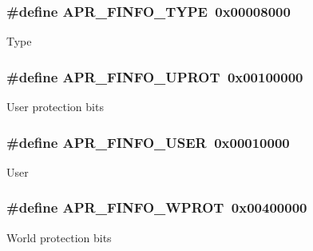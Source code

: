 \subsubsection[{\texorpdfstring{A\+P\+R\+\_\+\+F\+I\+N\+F\+O\+\_\+\+T\+Y\+PE}{APR_FINFO_TYPE}}]{\setlength{\rightskip}{0pt plus 5cm}\#define A\+P\+R\+\_\+\+F\+I\+N\+F\+O\+\_\+\+T\+Y\+PE~0x00008000}\hypertarget{group__apr__file__stat_gad5d25f25527ee77c08bb20aae141306c}{}\label{group__apr__file__stat_gad5d25f25527ee77c08bb20aae141306c}
Type 
\subsubsection[{\texorpdfstring{A\+P\+R\+\_\+\+F\+I\+N\+F\+O\+\_\+\+U\+P\+R\+OT}{APR_FINFO_UPROT}}]{\setlength{\rightskip}{0pt plus 5cm}\#define A\+P\+R\+\_\+\+F\+I\+N\+F\+O\+\_\+\+U\+P\+R\+OT~0x00100000}\hypertarget{group__apr__file__stat_gac85e4335fcf91881b11b3e8a4b224aca}{}\label{group__apr__file__stat_gac85e4335fcf91881b11b3e8a4b224aca}
User protection bits 
\subsubsection[{\texorpdfstring{A\+P\+R\+\_\+\+F\+I\+N\+F\+O\+\_\+\+U\+S\+ER}{APR_FINFO_USER}}]{\setlength{\rightskip}{0pt plus 5cm}\#define A\+P\+R\+\_\+\+F\+I\+N\+F\+O\+\_\+\+U\+S\+ER~0x00010000}\hypertarget{group__apr__file__stat_ga599d92111a5cca379a06980025044e12}{}\label{group__apr__file__stat_ga599d92111a5cca379a06980025044e12}
User 
\subsubsection[{\texorpdfstring{A\+P\+R\+\_\+\+F\+I\+N\+F\+O\+\_\+\+W\+P\+R\+OT}{APR_FINFO_WPROT}}]{\setlength{\rightskip}{0pt plus 5cm}\#define A\+P\+R\+\_\+\+F\+I\+N\+F\+O\+\_\+\+W\+P\+R\+OT~0x00400000}\hypertarget{group__apr__file__stat_gab970792384fe9a805cf66983350eefdc}{}\label{group__apr__file__stat_gab970792384fe9a805cf66983350eefdc}
World protection bits 

